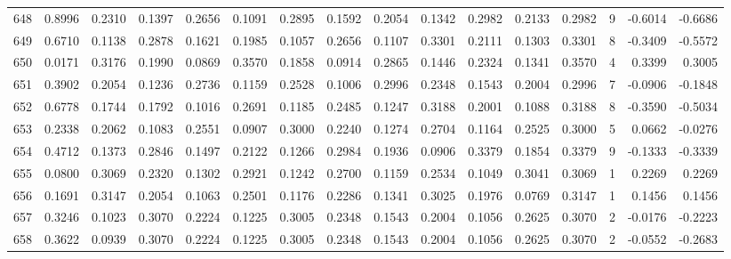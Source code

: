 \begin{tabular}{lrrrrrrrrrrrrrrr}
648 &      0.8996 &  0.2310 &  0.1397 &  0.2656 &  0.1091 &  0.2895 &  0.1592 &  0.2054 &  0.1342 &  0.2982 &   0.2133 &     0.2982 &      9 &                   -0.6014 &                    -0.6686 \\
649 &      0.6710 &  0.1138 &  0.2878 &  0.1621 &  0.1985 &  0.1057 &  0.2656 &  0.1107 &  0.3301 &  0.2111 &   0.1303 &     0.3301 &      8 &                   -0.3409 &                    -0.5572 \\
650 &      0.0171 &  0.3176 &  0.1990 &  0.0869 &  0.3570 &  0.1858 &  0.0914 &  0.2865 &  0.1446 &  0.2324 &   0.1341 &     0.3570 &      4 &                    0.3399 &                     0.3005 \\
651 &      0.3902 &  0.2054 &  0.1236 &  0.2736 &  0.1159 &  0.2528 &  0.1006 &  0.2996 &  0.2348 &  0.1543 &   0.2004 &     0.2996 &      7 &                   -0.0906 &                    -0.1848 \\
652 &      0.6778 &  0.1744 &  0.1792 &  0.1016 &  0.2691 &  0.1185 &  0.2485 &  0.1247 &  0.3188 &  0.2001 &   0.1088 &     0.3188 &      8 &                   -0.3590 &                    -0.5034 \\
653 &      0.2338 &  0.2062 &  0.1083 &  0.2551 &  0.0907 &  0.3000 &  0.2240 &  0.1274 &  0.2704 &  0.1164 &   0.2525 &     0.3000 &      5 &                    0.0662 &                    -0.0276 \\
654 &      0.4712 &  0.1373 &  0.2846 &  0.1497 &  0.2122 &  0.1266 &  0.2984 &  0.1936 &  0.0906 &  0.3379 &   0.1854 &     0.3379 &      9 &                   -0.1333 &                    -0.3339 \\
655 &      0.0800 &  0.3069 &  0.2320 &  0.1302 &  0.2921 &  0.1242 &  0.2700 &  0.1159 &  0.2534 &  0.1049 &   0.3041 &     0.3069 &      1 &                    0.2269 &                     0.2269 \\
656 &      0.1691 &  0.3147 &  0.2054 &  0.1063 &  0.2501 &  0.1176 &  0.2286 &  0.1341 &  0.3025 &  0.1976 &   0.0769 &     0.3147 &      1 &                    0.1456 &                     0.1456 \\
657 &      0.3246 &  0.1023 &  0.3070 &  0.2224 &  0.1225 &  0.3005 &  0.2348 &  0.1543 &  0.2004 &  0.1056 &   0.2625 &     0.3070 &      2 &                   -0.0176 &                    -0.2223 \\
658 &      0.3622 &  0.0939 &  0.3070 &  0.2224 &  0.1225 &  0.3005 &  0.2348 &  0.1543 &  0.2004 &  0.1056 &   0.2625 &     0.3070 &      2 &                   -0.0552 &                    -0.2683 \\

\end{tabular}
